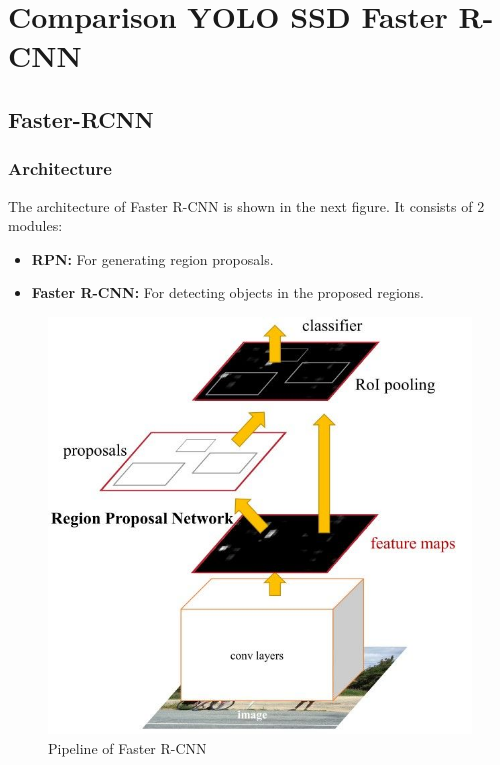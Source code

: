 \section{Comparison YOLO SSD Faster R-CNN}

    \subsection{Faster-RCNN}
        \subsubsection{Architecture}
            The architecture of Faster R-CNN is shown in the next figure. It consists of 2 modules:
            \begin{itemize}
                \item \textbf{RPN:} For generating region proposals. 
                \item \textbf{Faster R-CNN:} For detecting objects in the proposed regions.
            \end{itemize}
            \begin{figure}[H]
                \centering
                \includegraphics[width=0.6\linewidth]{img/R-CNN.png}
                \caption{Pipeline of Faster R-CNN}
            \end{figure}
